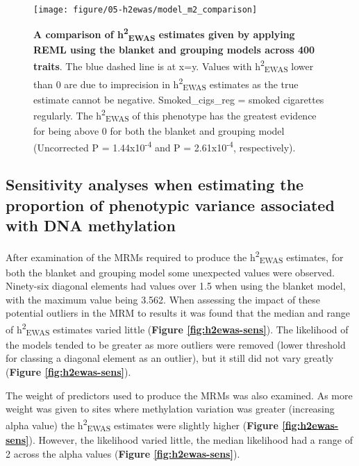 \documentclass[11pt,oneside]{bristolthesis}
\begin{document}
\begin{figure}

{\centering \texttt{[image: figure/05-h2ewas/model\_m2\_comparison]} 

}

\caption[A comparison of h\textsuperscript{2}\textsubscript{EWAS} estimates given by applying REML using the blanket and grouping models across 400 traits]{\textbf{A comparison of h\textsuperscript{2}\textsubscript{EWAS} estimates given by applying REML using the blanket and grouping models across 400 traits}. The blue dashed line is at x=y. Values with h\textsuperscript{2}\textsubscript{EWAS} lower than 0 are due to imprecision in h\textsuperscript{2}\textsubscript{EWAS} estimates as the true estimate cannot be negative. Smoked\_cigs\_reg = smoked cigarettes regularly. The h\textsuperscript{2}\textsubscript{EWAS} of this phenotype has the greatest evidence for being above 0 for both the blanket and grouping model (Uncorrected P = 1.44x10\textsuperscript{-4} and P = 2.61x10\textsuperscript{-4}, respectively).}\label{fig:h2ewas-estimates}
\end{figure}
\hypertarget{results-sensitivity-analyses-05}{%
\subsection{Sensitivity analyses when estimating the proportion of phenotypic variance associated with DNA methylation}\label{results-sensitivity-analyses-05}}

After examination of the MRMs required to produce the h\textsuperscript{2}\textsubscript{EWAS} estimates, for both the blanket and grouping model some unexpected values were observed. Ninety-six diagonal elements had values over 1.5 when using the blanket model, with the maximum value being 3.562. When assessing the impact of these potential outliers in the MRM to results it was found that the median and range of h\textsuperscript{2}\textsubscript{EWAS} estimates varied little (\textbf{Figure \ref{fig:h2ewas-sens}}). The likelihood of the models tended to be greater as more outliers were removed (lower threshold for classing a diagonal element as an outlier), but it still did not vary greatly (\textbf{Figure \ref{fig:h2ewas-sens}}).

The weight of predictors used to produce the MRMs was also examined. As more weight was given to sites where methylation variation was greater (increasing alpha value) the h\textsuperscript{2}\textsubscript{EWAS} estimates were slightly higher (\textbf{Figure \ref{fig:h2ewas-sens}}). However, the likelihood varied little, the median likelihood had a range of 2 across the alpha values (\textbf{Figure \ref{fig:h2ewas-sens}}).
\end{document}
